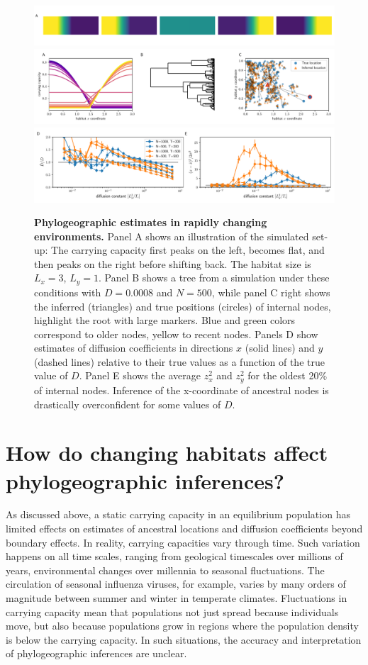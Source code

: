\documentclass[aps,rmp, twocolumn]{revtex4}
\begin{document}
\begin{figure}
    \includegraphics[width=\textwidth]{figures/seasaw_illustration}
    \includegraphics[width=\textwidth]{figures/seasaw_example}
    \includegraphics[width=\textwidth]{figures/seasaw}
    \caption{\label{fig:seasaw} {\bf Phylogeographic estimates in rapidly changing environments.} Panel A shows an illustration of the simulated set-up: The carrying capacity first peaks on the left, becomes flat, and then peaks on the right before shifting back. The habitat size is $L_x=3$, $L_y=1$.
    Panel B shows a tree from a simulation under these conditions with $D=0.0008$ and $N=500$, while panel C right shows the inferred (triangles) and true positions (circles) of internal nodes, highlight the root with large markers. Blue and green colors correspond to older nodes, yellow to recent nodes.
    Panels D show estimates of diffusion coefficients in directions $x$ (solid lines) and $y$ (dashed lines) relative to their true values as a function of the true value of $D$. Panel E shows the average $z_x^2$ and $z_y^2$ for the oldest 20\% of internal nodes. Inference of the x-coordinate of ancestral nodes is drastically overconfident for some values of $D$. }
\end{figure}

\section*{How do changing habitats affect phylogeographic inferences?}
As discussed above, a static carrying capacity in an equilibrium population has limited effects on estimates of ancestral locations and diffusion coefficients beyond boundary effects.
In reality, carrying capacities vary through time.
Such variation happens on all time scales, ranging from geological timescales over millions of years, environmental changes over millennia to seasonal fluctuations.
The circulation of seasonal influenza viruses, for example, varies by many orders of magnitude between summer and winter in temperate climates.
Fluctuations in carrying capacity mean that populations not just spread because individuals move, but also because populations grow in regions where the population density is below the carrying capacity.
In such situations, the accuracy and interpretation of phylogeographic inferences are unclear.
\end{document}
